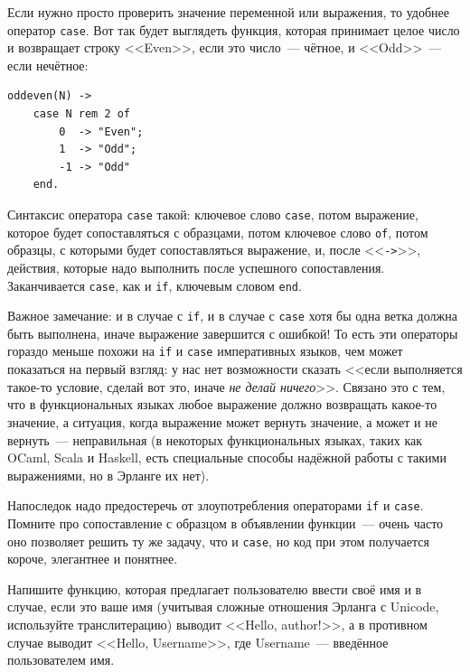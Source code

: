 \documentclass[
  paper=a4,
  fontsize=14pt,
  openany,
  appendixprefix=true
]{scrbook}
\begin{document}
Если нужно просто проверить значение переменной или выражения, то удобнее оператор \lstinline{case}. Вот так будет выглядеть функция, которая принимает целое число и возвращает строку <<Even>>, если это число~--- чётное, и <<Odd>>~--- если нечётное:
\begin{lstlisting}
oddeven(N) ->
    case N rem 2 of
        0  -> "Even";
        1  -> "Odd";
        -1 -> "Odd"
    end.
\end{lstlisting}

Синтаксис оператора \lstinline{case} такой: ключевое слово \lstinline{case}, потом выражение, которое будет сопоставляться с образцами, потом ключевое слово \lstinline{of}, потом образцы, с которыми будет сопоставляться выражение, и, после <<\lstinline{->}>>, действия, которые надо выполнить после успешного сопоставления. Заканчивается \lstinline{case}, как и \lstinline{if}, ключевым словом \lstinline{end}.


Важное замечание: и в случае с \lstinline{if}, и в случае с \lstinline{case} хотя бы одна ветка должна быть выполнена, иначе выражение завершится с ошибкой! То есть эти операторы гораздо меньше похожи на \lstinline{if} и \lstinline{case} императивных языков, чем может показаться на первый взгляд: у нас нет возможности сказать <<если выполняется такое-то условие, сделай вот это, иначе \emph{не делай ничего}>>. Связано это с тем, что в функциональных языках любое выражение должно возвращать какое-то значение, а ситуация, когда выражение может вернуть значение, а может и не вернуть~--- неправильная (в некоторых функциональных языках, таких как OCaml, Scala и Haskell, есть специальные способы надёжной работы с такими выражениями, но в Эрланге их нет).

Напоследок надо предостеречь от злоупотребления операторами \lstinline{if} и \lstinline{case}. Помните про сопоставление с образцом в объявлении функции~--- очень часто оно позволяет решить ту же задачу, что и \lstinline{case}, но код при этом получается короче, элегантнее и понятнее.

\begin{problem}\label{author}
Напишите функцию, которая предлагает пользователю ввести своё имя и в случае, если это ваше имя (учитывая сложные отношения Эрланга с Unicode, используйте транслитерацию) выводит <<Hello, author!>>, а в противном случае выводит <<Hello, Username>>, где Username~--- введённое пользователем имя.
\end{problem}
\end{document}
